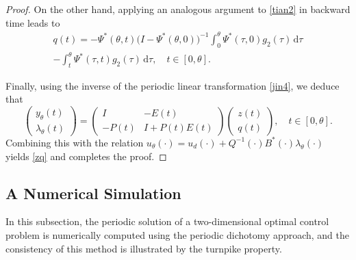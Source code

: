 \documentclass{IEEEtran}
\begin{document}
\begin{proof}
		On the other hand, applying an analogous argument to \eqref{tian2} in backward time leads to
		\begin{multline*}
			q(t)=-\Psi^*(\theta,t)\big(I-\Psi^*(\theta,0)\big)^{-1}\int_0^\theta \Psi^*(\tau,0)g_2(\tau)\,\mathrm{d}\tau\\
			-\int_t^\theta\Psi^*(\tau,t)g_2(\tau)\,\mathrm{d}\tau,\quad t \in[0,\theta].
		\end{multline*}   
		
		Finally, using the inverse of the periodic linear transformation \eqref{jin4}, we deduce that
		\begin{equation*}
			\begin{pmatrix}
				y_\theta(t) \\ \lambda_\theta(t)
			\end{pmatrix}
			=
			\begin{pmatrix}
				I & -E(t) \\ -P(t) & I+P(t) E(t)
			\end{pmatrix}
			\begin{pmatrix}
				z(t) \\ q(t)
			\end{pmatrix},\quad t\in[0,\theta].
		\end{equation*}
		Combining this with the relation $u_\theta(\cdot) = u_d(\cdot)+Q^{-1}(\cdot)B^*(\cdot)\lambda_\theta(\cdot)$ yields \eqref{zq} and completes the proof.
	\end{proof}
	
	\subsection{A Numerical Simulation}\label{ans}
	In this subsection, the periodic solution of a two-dimensional optimal control problem is numerically computed using the periodic dichotomy approach, and the consistency of this method is illustrated by the turnpike property.
	
\end{document}
